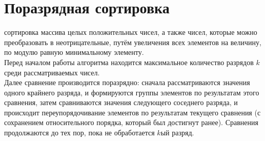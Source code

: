 \section{Поразрядная сортировка}
 сортировка массива целых положительных чисел, а также чисел, которые можно преобразовать в неотрицательные, путём увеличения всех элементов на величину, по модулю равную минимальному элементу.\\

Перед началом работы алгоритма находится максимальное количество разрядов $k$ среди рассматриваемых чисел.\\

Далее сравнение производится поразрядно: сначала рассматриваются значения одного крайнего разряда, и формируются группы элементов по результатам этого сравнения, затем сравниваются значения следующего соседнего разряда, и происходит переупорядочивание элементов по результатам текущего сравнения (с сохранением относительного порядка, который был достигнут ранее). Сравнения продолжаются до тех пор, пока не обработается $k$ый разряд.\\

